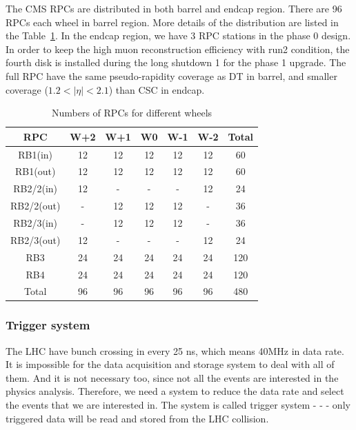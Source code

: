 The CMS RPCs are distributed in both barrel and endcap region. There are 96 RPCs each wheel in barrel region. More details of the distribution are listed in the Table~\ref{tab:c3cmsrpc}. In the endcap region, we have 3 RPC stations in the phase 0 design. In order to keep the high muon reconstruction efficiency with run2 condition, the fourth disk is installed during the long shutdown 1 for the phase 1 upgrade. The full RPC have the same pseudo-rapidity coverage as DT in barrel, and smaller coverage ($1.2<|\eta|<2.1$) than CSC in endcap.

\begin{table}[htbp]
\fontsize{10 pt}{1.2 em}
\selectfont
\begin{centering}
\caption{\label{tab:c3cmsrpc} Numbers of RPCs for different wheels}
\hspace*{-4ex}
\begin{tabular}{|c|c|c|c|c|c|c|}
\hline
 RPC &  W+2 & W+1 & W0 & W-1 & W-2 & Total \\
\hline
 RB1(in) & 12 & 12 & 12 & 12 & 12 & 60 \\
\hline
 RB1(out) & 12 & 12 & 12 & 12 & 12 & 60 \\
\hline
 RB2/2(in) & 12 & - & - & - & 12 & 24 \\
\hline
 RB2/2(out) & - & 12 & 12 & 12 & - & 36 \\
\hline
 RB2/3(in) & - & 12 & 12 & 12 & - & 36 \\
\hline
 RB2/3(out) & 12 & - & - & - & 12 & 24 \\
\hline
 RB3 & 24 & 24 & 24 & 24 & 24 & 120 \\
\hline
 RB4 & 24 & 24 & 24 & 24 & 24 & 120 \\
\hline
 Total & 96 & 96 & 96 & 96 & 96 & 480 \\
\hline
\end{tabular}
\par\end{centering}
\end{table}

\subsubsection{Trigger system}

The LHC have bunch crossing in every 25 ns, which means 40MHz in data rate. It is impossible for the data acquisition and storage system to deal with all of them. And it is not necessary too, since not all the events are interested in the physics analysis. Therefore, we need a system to reduce the data rate and select the events that we are interested in. The system is called trigger system - - - only triggered data will be read and stored from the LHC collision. 

